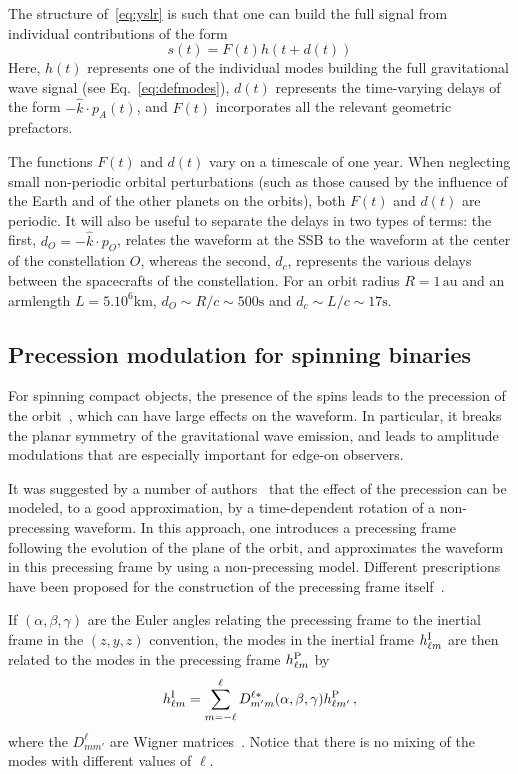 \documentclass[aps,showpacs,%
prd,superscriptaddress,nofootinbib]{revtex4}
\newcommand{\be}{\begin{equation}}
\newcommand{\ee}{\end{equation}}
\begin{document}
The structure of~\eqref{eq:yslr} is such that one can build the full signal from individual contributions of the form
\be
	s(t) = F(t) h(t + d(t))
\ee
Here, $h(t)$ represents one of the individual modes building the full gravitational wave signal (see Eq.~\eqref{eq:defmodes}), $d(t)$ represents the time-varying delays of the form $-\hat{k}\cdot p_{A}(t)$, and $F(t)$ incorporates all the relevant geometric prefactors.

The functions $F(t)$ and $d(t)$ vary on a timescale of one year. When neglecting small non-periodic orbital perturbations (such as those caused by the influence of the Earth and of the other planets on the orbits), both $F(t)$ and $d(t)$ are periodic. It will also be useful to separate the delays in two types of terms: the first, $d_{O} = -\hat{k}\cdot p_{O}$, relates the waveform at the SSB to the waveform at the center of the constellation $O$, whereas the second, $d_{c}$, represents the various delays between the spacecrafts of the constellation. For an orbit radius $R=1\,\mathrm{au}$ and an armlength $L=5.10^{6}\mathrm{km}$, $d_{O} \sim R/c \sim 500\mathrm{s}$ and $d_{c} \sim L/c \sim 17\mathrm{s}$.


\subsection{Precession modulation for spinning binaries}
\label{subsec:modulationPrec}

For spinning compact objects, the presence of the spins leads to the precession of the orbit~\cite{Apostolatos+94, Kidder95}, which can have large effects on the waveform. In particular, it breaks the planar symmetry of the gravitational wave emission, and leads to amplitude modulations that are especially important for edge-on observers.

It was suggested by a number of authors~\cite{} that the effect of the precession can be modeled, to a good approximation, by a time-dependent rotation of a non-precessing waveform. In this approach, one introduces a precessing frame following the evolution of the plane of the orbit, and approximates the waveform in this precessing frame by using a non-precessing model. Different prescriptions have been proposed for the construction of the precessing frame itself~\cite{}.

If $(\alpha, \beta, \gamma)$ are the Euler angles relating the precessing frame to the inertial frame in the $(z,y,z)$ convention, the modes in the inertial frame $h_{\ell m}^{\rm I}$ are then related to the modes in the precessing frame $h_{\ell m}^{\rm P}$ by~\cite{Goldberg+67}
\be\label{eq:wignerrot}
	h_{\ell m}^{\rm I} = \sum\limits_{m=-\ell}^{\ell} D^{\ell *}_{m'm} (\alpha,\beta,\gamma) h_{\ell m'}^{\rm P} \,,
\ee
where the $D^{\ell}_{mm'}$ are Wigner matrices~\cite{}. Notice that there is no mixing of the modes with different values of $\ell$.
\end{document}
